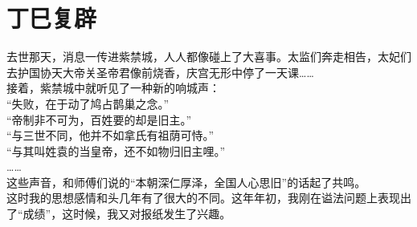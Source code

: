 \fancyhead[RO]{\thepage} %
\fancyhead[LE]{\thepage} %
\chapter*{丁巳复辟}
去世那天，消息一传进紫禁城，人人都像碰上了大喜事。太监们奔走相告，太妃们去护国协天大帝关圣帝君像前烧香，庆宫无形中停了一天课……\\

接着，紫禁城中就听见了一种新的响城声：\\

“失败，在于动了鸠占鹊巢之念。”\\

“帝制非不可为，百姓要的却是旧主。”\\

“与三世不同，他并不如拿氏有祖荫可恃。”\\

“与其叫姓袁的当皇帝，还不如物归旧主哩。”\\

……\\

这些声音，和师傅们说的“本朝深仁厚泽，全国人心思旧”的话起了共鸣。\\

这时我的思想感情和头几年有了很大的不同。这年年初，我刚在谥法问题上表现出了“成绩”，这时候，我又对报纸发生了兴趣。\\


